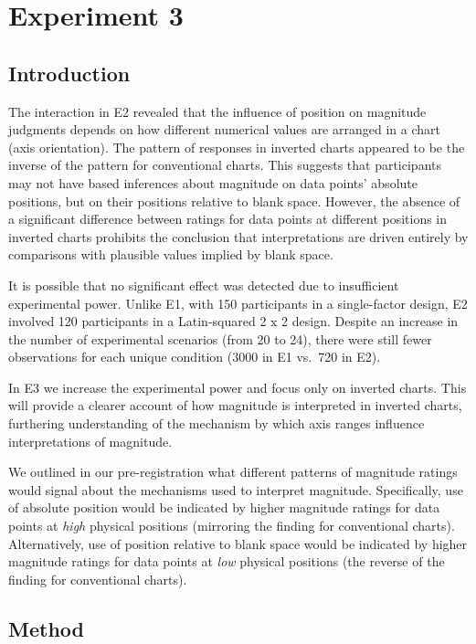\documentclass[journal]{vgtc}                %
\begin{document}
\hypertarget{experiment-3}{%
\section{Experiment 3}\label{experiment-3}}

\hypertarget{introduction-2}{%
\subsection{Introduction}\label{introduction-2}}

The interaction in E2 revealed that the influence of position on
magnitude judgments depends on how different numerical values are
arranged in a chart (axis orientation). The pattern of responses in
inverted charts appeared to be the inverse of the pattern for
conventional charts. This suggests that participants may not have based
inferences about magnitude on data points' absolute positions, but on
their positions relative to blank space. However, the absence of a
significant difference between ratings for data points at different
positions in inverted charts prohibits the conclusion that
interpretations are driven entirely by comparisons with plausible values
implied by blank space.

It is possible that no significant effect was detected due to
insufficient experimental power. Unlike E1, with 150 participants in a
single-factor design, E2 involved 120 participants in a Latin-squared 2
x 2 design. Despite an increase in the number of experimental scenarios
(from 20 to 24), there were still fewer observations for each unique
condition (3000 in E1 vs.~720 in E2).

In E3 we increase the experimental power and focus only on inverted
charts. This will provide a clearer account of how magnitude is
interpreted in inverted charts, furthering understanding of the
mechanism by which axis ranges influence interpretations of magnitude.

We outlined in our pre-registration what
different patterns of magnitude ratings would signal about the
mechanisms used to interpret magnitude. Specifically, use of absolute
position would be indicated by higher magnitude ratings for data points
at \emph{high} physical positions (mirroring the finding for conventional
charts). Alternatively, use of position relative to blank space would be
indicated by higher magnitude ratings for data points at \emph{low} physical
positions (the reverse of the finding for conventional charts).

\hypertarget{method-1}{%
\subsection{Method}\label{method-1}}
\end{document}
